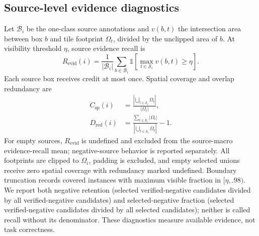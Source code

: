 \subsection{Source-level evidence diagnostics}
Let $\mathcal{B}_i$ be the one-class source annotations and $v(b,t)$ the intersection area between box $b$ and tile footprint $\Omega_t$, divided by the unclipped area of $b$. At visibility threshold $\eta$, source evidence recall is
\begin{equation}
R_{\mathrm{evid}}(i)=\frac{1}{|\mathcal{B}_i|}
\sum_{b\in\mathcal{B}_i}\mathbb{1}\!\left[
\max_{t\in\mathcal{S}_i}v(b,t)\geq\eta\right].
\label{eq:evidence-recall}
\end{equation}
Each source box receives credit at most once. Spatial coverage and overlap redundancy are
\begin{align}
C_{\mathrm{sp}}(i)&=\frac{|\bigcup_{t\in\mathcal{S}_i}\Omega_t|}{|\Omega_i|}, \\
D_{\mathrm{red}}(i)&=
\frac{\sum_{t\in\mathcal{S}_i}|\Omega_t|}
{|\bigcup_{t\in\mathcal{S}_i}\Omega_t|}-1.
\label{eq:spatial}
\end{align}
For empty sources, $R_{\mathrm{evid}}$ is undefined and excluded from the source-macro evidence-recall mean; negative-source behavior is reported separately. All footprints are clipped to $\Omega_i$, padding is excluded, and empty selected unions receive zero spatial coverage with redundancy marked undefined. Boundary truncation records covered instances with maximum visible fraction in $[\eta,.98)$. We report both negative retention (selected verified-negative candidates divided by all verified-negative candidates) and selected-negative fraction (selected verified-negative candidates divided by all selected candidates); neither is called recall without its denominator. These diagnostics measure available evidence, not task correctness.

